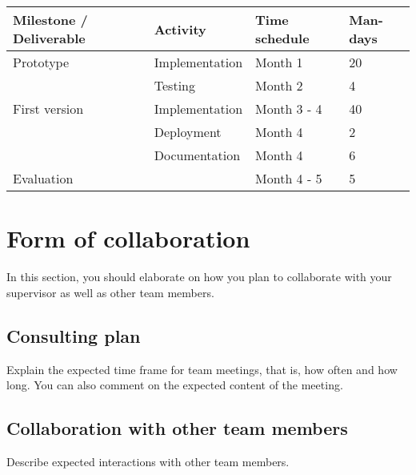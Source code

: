 \documentclass{article}
\begin{document}
\hskip-0.5cm
\begin{tabular}{ | m{11em} | m{23em} | m{2.5cm} | m{1.3cm} | }
   \hline
 Milestone / Deliverable & Activity & Time schedule & Man-days \\
 \hline
 Prototype & Implementation & Month 1 & 20 \\
           & Testing & Month 2 & 4 \\
 \hline
 First version & Implementation & Month 3 - 4 & 40 \\
               & Deployment & Month 4 & 2 \\
               & Documentation & Month 4 & 6 \\
 \hline
 Evaluation & & Month 4 - 5 & 5 \\
 \hline
\end{tabular}

\section{Form of collaboration}
In this section, you should elaborate on how you plan to collaborate with your supervisor as well as other team members.

\subsection{Consulting plan}
Explain the expected time frame for team meetings, that is, how often and how long.
You can also comment on the expected content of the meeting.

\subsection{Collaboration with other team members}
Describe expected interactions with other team members.
\end{document}
